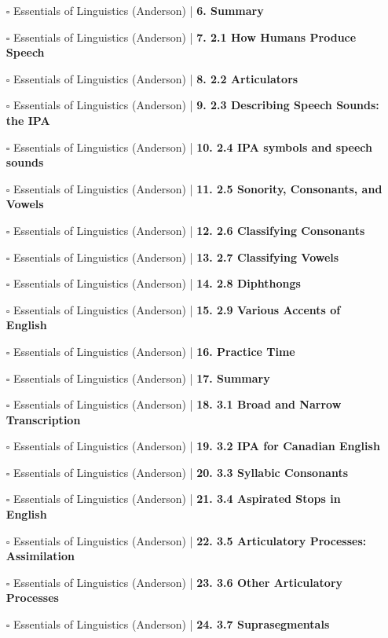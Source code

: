 \documentclass[a4, landscape, 12pt]{article}
\newcommand{\checkbox}{$\square$}%
\begin{document}
\begin{itemize}
{}
\item [\checkbox]  Essentials of Linguistics (Anderson) | \textbf{ 6. Summary
}
\item [\checkbox]  Essentials of Linguistics (Anderson) | \textbf{ 7. 2.1 How Humans Produce Speech
}
\item [\checkbox]  Essentials of Linguistics (Anderson) | \textbf{ 8. 2.2 Articulators
}
\item [\checkbox]  Essentials of Linguistics (Anderson) | \textbf{ 9. 2.3 Describing Speech Sounds: the IPA
}
\item [\checkbox]  Essentials of Linguistics (Anderson) | \textbf{ 10. 2.4 IPA symbols and speech sounds
}
\item [\checkbox]  Essentials of Linguistics (Anderson) | \textbf{ 11. 2.5 Sonority, Consonants, and Vowels
}
\item [\checkbox]  Essentials of Linguistics (Anderson) | \textbf{ 12. 2.6 Classifying Consonants
}
\item [\checkbox]  Essentials of Linguistics (Anderson) | \textbf{ 13. 2.7 Classifying Vowels
}
\item [\checkbox]  Essentials of Linguistics (Anderson) | \textbf{ 14. 2.8 Diphthongs
}
\item [\checkbox]  Essentials of Linguistics (Anderson) | \textbf{ 15. 2.9 Various Accents of English
}
\item [\checkbox]  Essentials of Linguistics (Anderson) | \textbf{ 16. Practice Time
}
\item [\checkbox]  Essentials of Linguistics (Anderson) | \textbf{ 17. Summary
}
\item [\checkbox]  Essentials of Linguistics (Anderson) | \textbf{ 18. 3.1 Broad and Narrow Transcription
}
\item [\checkbox]  Essentials of Linguistics (Anderson) | \textbf{ 19. 3.2 IPA for Canadian English
}
\item [\checkbox]  Essentials of Linguistics (Anderson) | \textbf{ 20. 3.3 Syllabic Consonants
}
\item [\checkbox]  Essentials of Linguistics (Anderson) | \textbf{ 21. 3.4 Aspirated Stops in English
}
\item [\checkbox]  Essentials of Linguistics (Anderson) | \textbf{ 22. 3.5 Articulatory Processes: Assimilation
}
\item [\checkbox]  Essentials of Linguistics (Anderson) | \textbf{ 23. 3.6 Other Articulatory Processes
}
\item [\checkbox]  Essentials of Linguistics (Anderson) | \textbf{ 24. 3.7 Suprasegmentals
}
\end{itemize}
\end{document}
